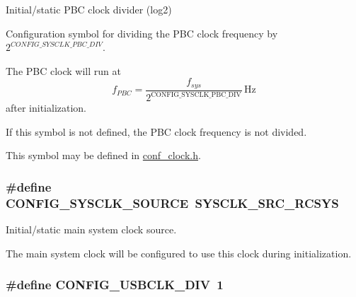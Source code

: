 \-Initial/static \-P\-B\-C clock divider (log2) 

\-Configuration symbol for dividing the \-P\-B\-C clock frequency by $2^{CONFIG\_SYSCLK\_PBC\_DIV}$.

\-The \-P\-B\-C clock will run at \[ f_{PBC} = \frac{f_{sys}}{2^\mathrm{CONFIG\_SYSCLK\_PBC\_DIV}}\,\mbox{Hz} \] after initialization.

\-If this symbol is not defined, the \-P\-B\-C clock frequency is not divided.

\-This symbol may be defined in \hyperlink{conf__clock_8h}{conf\-\_\-clock.\-h}. \hypertarget{group__sysclk__group_ga7bb6bbe88b7fb398ef8f0befe936e0e7}{
\subsubsection[{\-C\-O\-N\-F\-I\-G\-\_\-\-S\-Y\-S\-C\-L\-K\-\_\-\-S\-O\-U\-R\-C\-E}]{\setlength{\rightskip}{0pt plus 5cm}\#define \-C\-O\-N\-F\-I\-G\-\_\-\-S\-Y\-S\-C\-L\-K\-\_\-\-S\-O\-U\-R\-C\-E~\-S\-Y\-S\-C\-L\-K\-\_\-\-S\-R\-C\-\_\-\-R\-C\-S\-Y\-S}}
\label{group__sysclk__group_ga7bb6bbe88b7fb398ef8f0befe936e0e7}


\-Initial/static main system clock source. 

\-The main system clock will be configured to use this clock during initialization. \hypertarget{group__sysclk__group_gac73a11432c1931f5f2daa030eda13923}{
\subsubsection[{\-C\-O\-N\-F\-I\-G\-\_\-\-U\-S\-B\-C\-L\-K\-\_\-\-D\-I\-V}]{\setlength{\rightskip}{0pt plus 5cm}\#define \-C\-O\-N\-F\-I\-G\-\_\-\-U\-S\-B\-C\-L\-K\-\_\-\-D\-I\-V~1}}
\label{group__sysclk__group_gac73a11432c1931f5f2daa030eda13923}


